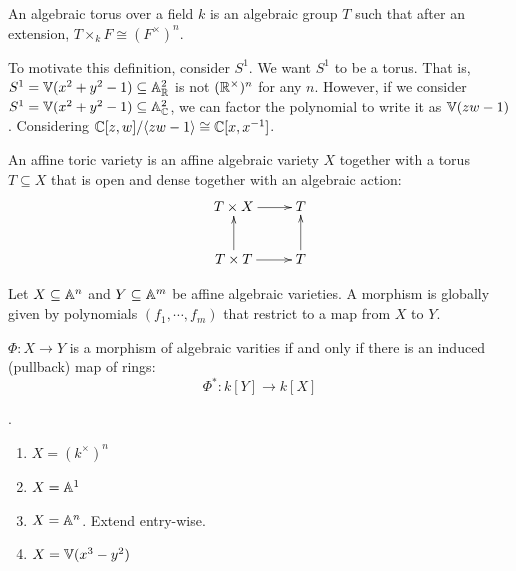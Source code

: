 \documentclass[12pt]{article}
\begin{document}
\begin{definition}
    An algebraic torus over a field $k$ is an algebraic group $T$ such that after an extension, $T \times_k F \cong (F^\times)^n$. 
\end{definition}

\begin{remark}
    To motivate this definition, consider $S^1$. We want $S^1$ to be a torus. That is, $S^1 = \mathbb V(x^2+y^2-1) \subseteq \mathbb A^2_\mathbb R$ is not $(\mathbb R^\times)^n$ for any $n$. However, if we consider $S^1 = \mathbb V(x^2+y^2-1) \subseteq \mathbb A^2_\mathbb C$, we can factor the polynomial to write it as $\mathbb V(zw-1)$. Considering $\mathbb C[z,w]/\langle zw-1\rangle \cong \mathbb C[x, x^{-1}]$. 
\end{remark}

\begin{definition}
    An affine toric variety is an affine algebraic variety $X$ together with a torus $T \subseteq X$ that is open and dense together with an algebraic action: 
    \[ \xymatrix{T \times X \ar[r] & T \\ T \times T \ar[u] \ar[r] & T \ar[u] } \]
\end{definition}

\begin{definition}
    Let $X \subseteq \mathbb A^n$ and $Y \subseteq \mathbb A^m$ be affine algebraic varieties. A morphism is globally given by polynomials $(f_1, \cdots, f_m)$ that restrict to a map from $X$ to $Y$.
\end{definition}

\begin{lemma}
    $\Phi: X \to Y$ is a morphism of algebraic varities if and only if there is an induced (pullback) map of rings: 
    \[ \Phi^*: k[Y] \to k[X]\]
\end{lemma}

\begin{example}
    .
    \begin{enumerate}
        \item $X = (k^\times)^n$
        \item $X = \mathbb A^1$
        \item $X = \mathbb A^n$. Extend entry-wise. 
        \item $X = \mathbb V(x^3-y^2)$
    \end{enumerate}
\end{example}
\end{document}
